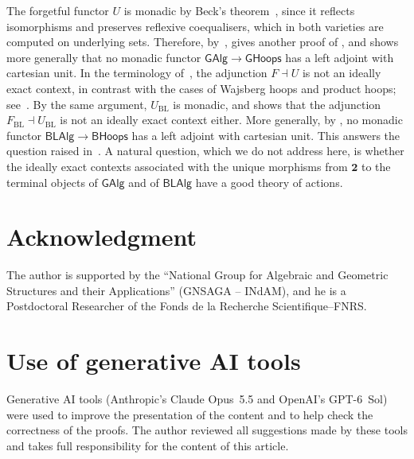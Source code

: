 \documentclass[reqno,a4paper]{amsart}
\theoremstyle{plain}
\theoremstyle{definition}
\theoremstyle{remark}
\numberwithin{equation}{section}
\newcommand{\two}{\mathbf{2}}
\newcommand{\GHoops}{\ensuremath{\mathsf{GHoops}}}
\newcommand{\GAlg}{\ensuremath{\mathsf{GAlg}}}
\newcommand{\BHoops}{\ensuremath{\mathsf{BHoops}}}
\newcommand{\BLAlg}{\ensuremath{\mathsf{BLAlg}}}
\begin{document}
The forgetful functor $U$ is monadic by Beck's theorem~\cite[Section~3.3]{BarrWells}, since it reflects isomorphisms and preserves reflexive coequalisers, which in both varieties are computed on underlying sets. Therefore, by~\cite[Theorem~2.6]{IdeallyExact},  gives another proof of , and shows more generally that no monadic functor $\GAlg\to\GHoops$ has a left adjoint with cartesian unit. In the terminology of~\cite{MMP}, the adjunction $F\dashv U$ is not an ideally exact context, in contrast with the cases of Wajsberg hoops and product hoops; see~\cite[Section~6.14]{MMP}. By the same argument, $U_{\mathrm{BL}}$ is monadic, and  shows that the adjunction $F_{\mathrm{BL}}\dashv U_{\mathrm{BL}}$ is not an ideally exact context either. More generally, by , no monadic functor $\BLAlg\to\BHoops$ has a left adjoint with cartesian unit. This answers the question raised in~\cite[Section~4]{MP}. A natural question, which we do not address here, is whether the ideally exact contexts associated with the unique morphisms from $\two$ to the terminal objects of $\GAlg$ and of $\BLAlg$ have a good theory of actions.

\section*{Acknowledgment}

The author is supported by the ``National Group for Algebraic and Geometric Structures and their Applications'' (GNSAGA -- INdAM), and he is a Postdoctoral Researcher of the Fonds de la Recherche Scientifique--FNRS.


\section*{Use of generative AI tools}
Generative AI tools (Anthropic's Claude Opus~5.5 and OpenAI's GPT-6~Sol) were used to improve the presentation of the content and to help check the correctness of the proofs. The author reviewed all suggestions made by these tools and takes full responsibility for the content of this article.
\end{document}
